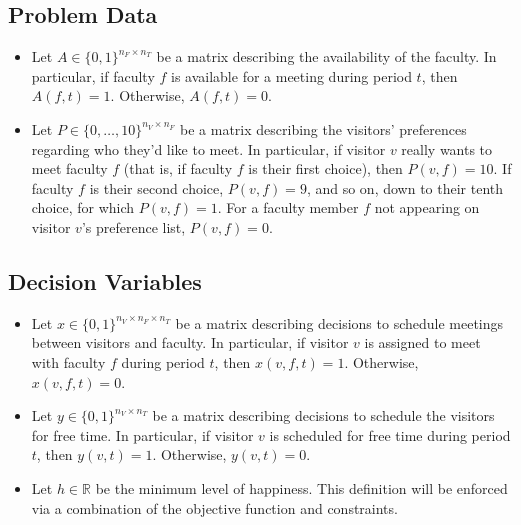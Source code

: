 \documentclass[12pt]{article}
\newcommand{\R}{\mathbb R}
\theoremstyle{definition}
\newtheorem{definition set}{Definition Set}%
\newtheorem{problem statement}{Problem Statement} %
\theoremstyle{remark}
\theoremstyle{remark}
\begin{document}
\subsection{Problem Data}
\begin{itemize}
\item
Let $A \in \{0,1\}^{n_F \times n_T}$ be a matrix describing the availability of the faculty.
In particular, if faculty $f$ is available for a meeting during period $t$, then $A(f,t) = 1$.
Otherwise, $A(f,t) = 0$.

\item
Let $P \in \{0, \hdots  , 10\}^{n_V \times n_F}$ be a matrix describing the visitors\rq{} preferences regarding who they\rq{}d like to meet.
In particular, if visitor $v$ really wants to meet faculty $f$ (that is, if faculty $f$ is their first choice), then $P(v,f) = 10$.
If faculty $f$ is their second choice, $P(v,f) = 9$, and so on, down to their tenth choice, for which $P(v,f) = 1$.
For a faculty member $f$ not appearing on visitor $v$\rq{}s preference list, $P(v,f) = 0$.
\end{itemize}

\subsection{Decision Variables}
\begin{itemize}
\item
Let $x \in \{0,1\}^{n_V \times n_F \times n_T}$ be a matrix describing decisions to schedule meetings between visitors and faculty.
In particular, if visitor $v$ is assigned to meet with faculty $f$ during period $t$, then $x(v,f,t) = 1$.
Otherwise, $x(v,f,t) = 0$.

\item
Let $y \in \{0,1\}^{n_V \times n_T}$ be a matrix describing decisions to schedule the visitors for free time.
In particular, if visitor $v$ is scheduled for free time during period $t$, then $y(v,t) = 1$.
Otherwise, $y(v,t) = 0$.

\item
Let $h \in \R$ be the minimum level of happiness.
This definition will be enforced via a combination of the objective function and constraints.
\end{itemize}
\end{document}

